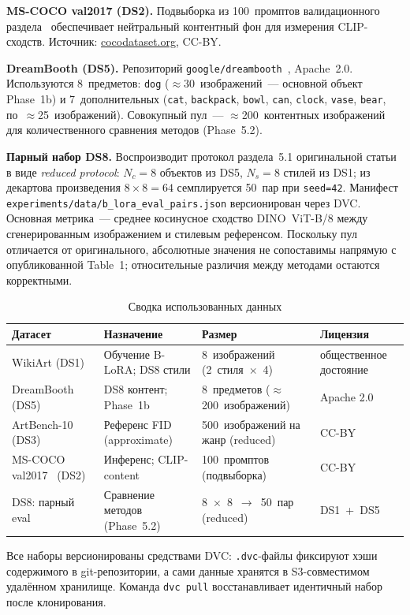 \textbf{MS-COCO val2017 (DS2).} Подвыборка из 100~промптов валидационного раздела~\cite{lin2014coco} обеспечивает нейтральный контентный фон для измерения CLIP-сходств. Источник: \url{cocodataset.org}, CC-BY.

\textbf{DreamBooth (DS5).} Репозиторий \texttt{google/dreambooth}~\cite{ruiz2023dreambooth}, Apache~2.0. Используются 8~предметов: \texttt{dog} ($\approx$30~изображений~--- основной объект Phase~1b) и 7~дополнительных (\texttt{cat}, \texttt{backpack}, \texttt{bowl}, \texttt{can}, \texttt{clock}, \texttt{vase}, \texttt{bear}, по~$\approx$25~изображений). Совокупный пул~--- $\approx$200~контентных изображений для количественного сравнения методов (Phase~5.2).

\textbf{Парный набор DS8.} Воспроизводит протокол раздела~5.1 оригинальной статьи~\cite{frenkel2024blora} в виде \textit{reduced protocol}: $N_c{=}8$ объектов из DS5, $N_s{=}8$ стилей из DS1; из декартова произведения $8{\times}8{=}64$ семплируется 50~пар при \texttt{seed=42}. Манифест \texttt{experiments/data/b\_lora\_eval\_pairs.json} версионирован через DVC. Основная метрика~--- среднее косинусное сходство DINO~ViT-B/8 между сгенерированным изображением и стилевым референсом. Поскольку пул отличается от оригинального, абсолютные значения не сопоставимы напрямую с опубликованной Table~1; относительные различия между методами остаются корректными.

\begin{table}[h]
    \centering
    \caption{Сводка использованных данных}
    \label{tab:datasets}
    \begin{tabular}{p{2.8cm}p{4.2cm}p{4.0cm}p{3.4cm}}
        \hline
        \textbf{Датасет} & \textbf{Назначение} & \textbf{Размер} & \textbf{Лицензия} \\
        \hline
        WikiArt (DS1) & Обучение B-LoRA; DS8 стили & 8~изображений (2~стиля~$\times$~4) & общественное достояние \\
        DreamBooth~\cite{ruiz2023dreambooth} (DS5) & DS8 контент; Phase~1b & 8~предметов ($\approx$200~изображений) & Apache 2.0 \\
        ArtBench-10~\cite{liao2022artbench} (DS3) & Референс FID (approximate) & 500~изображений на жанр (reduced) & CC-BY \\
        MS-COCO val2017~\cite{lin2014coco} (DS2) & Инференс; CLIP-content & 100~промптов (подвыборка) & CC-BY \\
        DS8: парный eval & Сравнение методов (Phase~5.2) & 8~$\times$~8~$\to$~50~пар (reduced) & DS1~+~DS5 \\
        \hline
    \end{tabular}
\end{table}

Все наборы версионированы средствами DVC: \texttt{.dvc}-файлы фиксируют хэши содержимого в git-репозитории, а сами данные хранятся в S3-совместимом удалённом хранилище. Команда \texttt{dvc pull} восстанавливает идентичный набор после клонирования.
